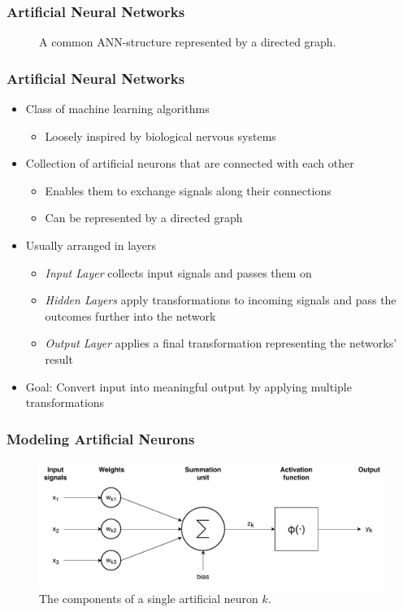 \begin{frame}
  \frametitle{Artificial Neural Networks}
  \begin{figure}
    \centering
    \resizebox{0.7\textwidth}{!}{}
    \caption{A common ANN-structure represented by a directed graph.}
  \end{figure}
\end{frame}

\begin{frame}
  \frametitle{Artificial Neural Networks}
  \begin{itemize}
    \item Class of machine learning algorithms
      \begin{itemize}
        \item Loosely inspired by biological nervous systems
      \end{itemize}
    \item Collection of artificial neurons that are connected with
      each other
      \begin{itemize}
        \item Enables them to exchange signals along their connections
        \item Can be represented by a directed graph
      \end{itemize}
    \item Usually arranged in layers
      \begin{itemize}
        \item \textit{Input Layer} collects input signals and passes
          them on
        \item \textit{Hidden Layers} apply transformations to incoming
          signals and pass the outcomes further into the network
        \item \textit{Output Layer} applies a final transformation
          representing the networks' result
      \end{itemize}
    \item Goal: Convert input into meaningful output by applying
      multiple transformations
  \end{itemize}
\end{frame}

\begin{frame}
  \frametitle{Modeling Artificial Neurons}
  \begin{figure}
    \includegraphics[width=.9\textwidth]{../figures/single_neuron}
    \caption{The components of a single artificial neuron \(k\).}
  \end{figure}
\end{frame}

